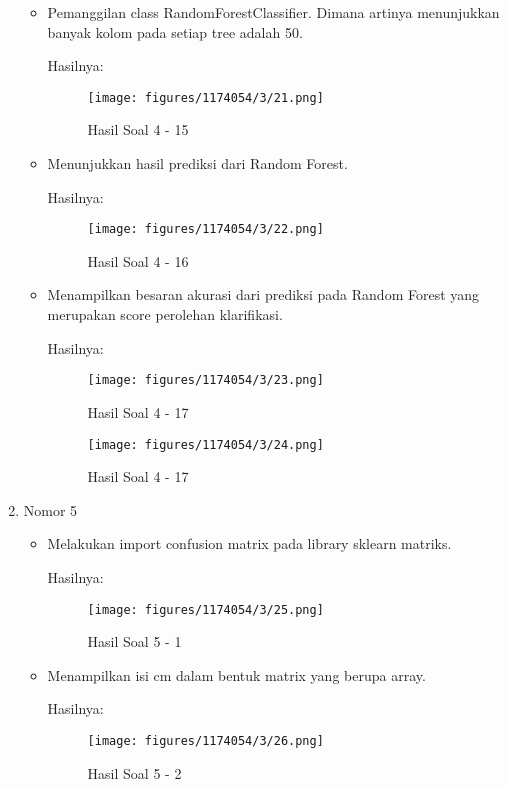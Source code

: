 \begin{enumerate}
\begin{itemize}
\item Pemanggilan class RandomForestClassifier. Dimana artinya menunjukkan banyak kolom pada setiap tree adalah 50.

Hasilnya:
\begin{figure}[H]
	\centering
		\texttt{[image: figures/1174054/3/21.png]}
		\caption{Hasil Soal 4 - 15}
\end{figure}
		
\item Menunjukkan hasil prediksi dari Random Forest.

Hasilnya:
\begin{figure}[H]
	\centering
		\texttt{[image: figures/1174054/3/22.png]}
		\caption{Hasil Soal 4 - 16}
\end{figure}

\item Menampilkan besaran akurasi dari prediksi pada Random Forest yang merupakan score perolehan klarifikasi.

Hasilnya:
\begin{figure}[H]
	\centering
		\texttt{[image: figures/1174054/3/23.png]}
		\caption{Hasil Soal 4 - 17}
\end{figure}
\begin{figure}[H]
	\centering
		\texttt{[image: figures/1174054/3/24.png]}
		\caption{Hasil Soal 4 - 17}
\end{figure}
\end{itemize}

\item Nomor 5
\hfill\break
\begin{itemize}
\item Melakukan import confusion matrix pada library sklearn matriks.

Hasilnya:
\begin{figure}[H]
	\centering
		\texttt{[image: figures/1174054/3/25.png]}
		\caption{Hasil Soal 5 - 1}
\end{figure}
		
\item Menampilkan isi cm dalam bentuk matrix yang berupa array.

Hasilnya:
\begin{figure}[H]
	\centering
		\texttt{[image: figures/1174054/3/26.png]}
		\caption{Hasil Soal 5 - 2}
\end{figure}
		

\end{itemize}
\end{enumerate}
